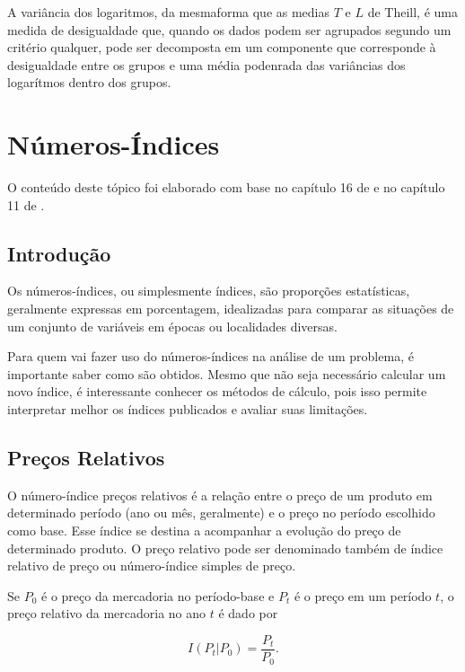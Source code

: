 \documentclass[
]{book}
\begin{document}
A variância dos logaritmos, da mesmaforma que as medias \(T\) e \(L\) de Theill, é uma medida de desigualdade que, quando os dados podem ser agrupados segundo um critério qualquer, pode ser decomposta em um componente que corresponde à desigualdade entre os grupos e uma média podenrada das variâncias dos logarítmos dentro dos grupos.

\hypertarget{nuxfameros-uxedndices}{%
\chapter{Números-Índices}\label{nuxfameros-uxedndices}}

O conteúdo deste tópico foi elaborado com base no capítulo 16 de \citet{Hoffmann2006} e no capítulo 11 de \citet{Sartoris2013}.

\hypertarget{introduuxe7uxe3o}{%
\section{Introdução}\label{introduuxe7uxe3o}}

Os números-índices, ou simplesmente índices, são proporções estatísticas,
geralmente expressas em porcentagem, idealizadas para comparar as situações de
um conjunto de variáveis em épocas ou localidades diversas.

Para quem vai fazer uso do números-índices na análise de um problema, é
importante saber como são obtidos. Mesmo que não seja necessário calcular um
novo índice, é interessante conhecer os métodos de cálculo, pois isso permite
interpretar melhor os índices publicados e avaliar suas limitações.

\hypertarget{preuxe7os-relativos}{%
\section{Preços Relativos}\label{preuxe7os-relativos}}

O número-índice preços relativos é a relação entre o preço de um produto em determinado período (ano ou mês, geralmente) e o preço no período escolhido como base. Esse índice se destina a acompanhar a evolução do preço de determinado produto. O preço relativo pode ser denominado também de índice relativo de preço ou número-índice simples de preço.

Se \(P_0\) é o preço da mercadoria no período-base e \(P_t\) é o preço em um período \(t\), o preço relativo da mercadoria no ano \(t\) é dado por

\begin{equation}
  I(P_t| P_0) = \frac{P_t}{P_0}.
  \label{eq:IndicePrecoRelativo}
\end{equation}
\end{document}
